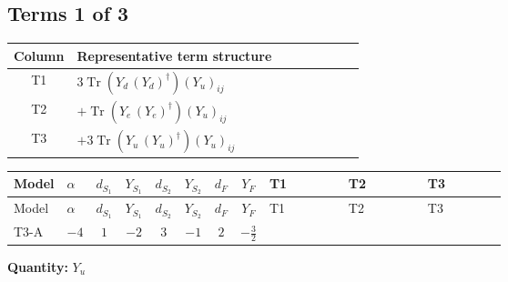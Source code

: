 \documentclass[8pt]{article}
\begin{document}
\begin{landscape}
\subsection*{Terms 1 of 3}
\begin{center}
\begin{tabular}{@{}c >{\raggedright\arraybackslash}p{0.82\linewidth}@{}}
\toprule
Column & Representative term structure \\
\midrule
T1 & \(\displaystyle 3 \operatorname{Tr}\!\left({Y_d}\,\left({Y_d}\right)^{\dagger}\right) \left({Y_u}\right)_{ij}\) \\
\midrule
T2 & \(\displaystyle +\operatorname{Tr}\!\left({Y_e}\,\left({Y_e}\right)^{\dagger}\right) \left({Y_u}\right)_{ij}\) \\
\midrule
T3 & \(\displaystyle +3 \operatorname{Tr}\!\left({Y_u}\,\left({Y_u}\right)^{\dagger}\right) \left({Y_u}\right)_{ij}\) \\
\midrule
\bottomrule
\end{tabular}
\end{center}
\smallskip
\tiny
\begin{longtable}{@{}llcccccc >{\raggedright\arraybackslash}p{0.21\linewidth} >{\raggedright\arraybackslash}p{0.21\linewidth} >{\raggedright\arraybackslash}p{0.21\linewidth}@{}}
\toprule
Model & $\alpha$ & $d_{S_1}$ & $Y_{S_1}$ & $d_{S_2}$ & $Y_{S_2}$ & $d_F$ & $Y_F$ & T1 & T2 & T3 \\
\midrule
\endfirsthead
\toprule
Model & $\alpha$ & $d_{S_1}$ & $Y_{S_1}$ & $d_{S_2}$ & $Y_{S_2}$ & $d_F$ & $Y_F$ & T1 & T2 & T3 \\
\midrule
\endhead
T3-A & $-4$ & $1$ & $-2$ & $3$ & $-1$ & $2$ & $-\frac{3}{2}$ & \scriptsize\adjustbox{max width=\linewidth}{$\begin{gathered} 3 \operatorname{Tr}\!\left({Y_d}\,\left({Y_d}\right)^{\dagger}\right) \left({Y_u}\right)_{ij}\end{gathered}$} & \scriptsize\adjustbox{max width=\linewidth}{$\begin{gathered} +\operatorname{Tr}\!\left({Y_e}\,\left({Y_e}\right)^{\dagger}\right) \left({Y_u}\right)_{ij}\end{gathered}$} & \scriptsize\adjustbox{max width=\linewidth}{$\begin{gathered} +3 \operatorname{Tr}\!\left({Y_u}\,\left({Y_u}\right)^{\dagger}\right) \left({Y_u}\right)_{ij}\end{gathered}$} \\
\midrule
\bottomrule
\end{longtable}
\clearpage
\noindent\textbf{Quantity: }$Y_u$\par\smallskip

\end{landscape}
\end{document}
